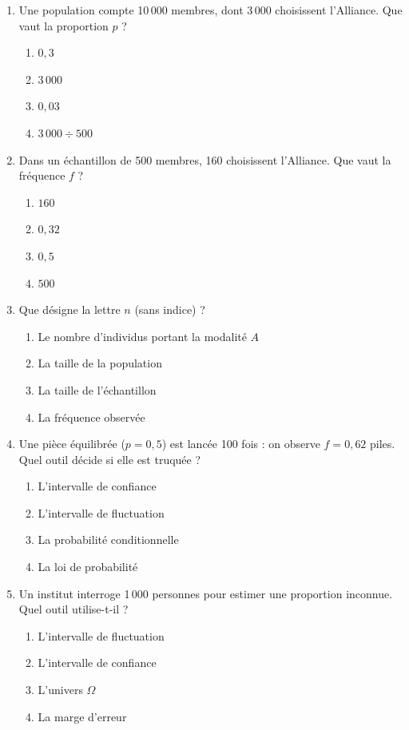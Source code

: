 \documentclass[11pt,a4paper]{article}
\begin{document}
	\begin{enumerate}[leftmargin=*, label=\textbf{Q\arabic*.}]
		\item Une population compte 10\,000 membres, dont 3\,000 choisissent
		l'Alliance. Que vaut la proportion $p$ ?
		\begin{enumerate}[label=(\alph*)]
			\item $0{,}3$
			\item $3\,000$
			\item $0{,}03$
			\item $3\,000 \div 500$
		\end{enumerate}
		
		\item Dans un échantillon de 500 membres, 160 choisissent l'Alliance. Que vaut
		la fréquence $f$ ?
		\begin{enumerate}[label=(\alph*)]
			\item $160$
			\item $0{,}32$
			\item $0{,}5$
			\item $500$
		\end{enumerate}
		
		\item Que désigne la lettre $n$ (sans indice) ?
		\begin{enumerate}[label=(\alph*)]
			\item Le nombre d'individus portant la modalité $A$
			\item La taille de la population
			\item La taille de l'échantillon
			\item La fréquence observée
		\end{enumerate}
		
		\item Une pièce équilibrée ($p = 0{,}5$) est lancée 100 fois : on observe
		$f = 0{,}62$ piles. Quel outil décide si elle est truquée ?
		\begin{enumerate}[label=(\alph*)]
			\item L'intervalle de confiance
			\item L'intervalle de fluctuation
			\item La probabilité conditionnelle
			\item La loi de probabilité
		\end{enumerate}
		
		\item Un institut interroge 1\,000 personnes pour estimer une proportion
		inconnue. Quel outil utilise-t-il ?
		\begin{enumerate}[label=(\alph*)]
			\item L'intervalle de fluctuation
			\item L'intervalle de confiance
			\item L'univers $\Omega$
			\item La marge d'erreur
		\end{enumerate}
		

\end{enumerate}
\end{document}
